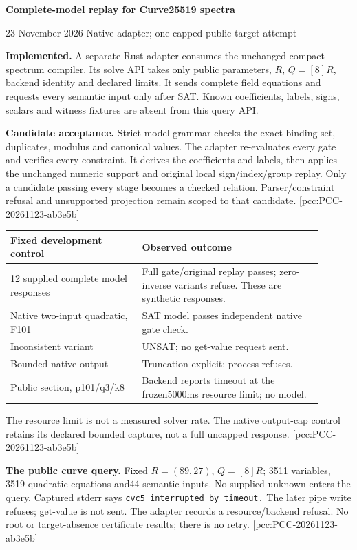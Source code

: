 \documentclass[10pt]{article}
\begin{document}
{\Large\bfseries\color{ink} Complete-model replay for Curve25519 spectra}\par
{\small 23 November 2026 \quad Native adapter; one capped public-target attempt}

\textbf{Implemented.} A separate Rust adapter consumes the unchanged compact
spectrum compiler. Its solve API takes only public parameters, $R$, $Q=[8]R$,
backend identity and declared limits. It sends complete field equations and
requests every semantic input only after SAT. Known coefficients, labels,
signs, scalars and witness fixtures are absent from this query API.

\textbf{Candidate acceptance.} Strict model grammar checks the exact binding
set, duplicates, modulus and canonical values. The adapter re-evaluates every
gate and verifies every constraint. It derives the coefficients and labels,
then applies the unchanged numeric support and original local sign/index/group
replay. Only a candidate passing every stage becomes a checked relation.
Parser/constraint refusal and unsupported projection remain scoped to that
candidate. [pcc:PCC-20261123-ab3e5b]

\begin{center}
\begin{tabular}{p{0.38\linewidth}p{0.52\linewidth}}
\toprule
Fixed development control & Observed outcome\\
\midrule
12 supplied complete model responses & Full gate/original replay passes; zero-inverse variants refuse. These are synthetic responses.\\
Native two-input quadratic, F101 & SAT model passes independent native gate check.\\
Inconsistent variant & UNSAT; no get-value request sent.\\
Bounded native output & Truncation explicit; process refuses.\\
Public section, p101/q3/k8 & Backend reports timeout at the frozen5000ms resource limit; no model.\\
\bottomrule
\end{tabular}
\end{center}
The resource limit is not a measured solver rate. The native output-cap
control retains its declared bounded capture, not a full uncapped response.
[pcc:PCC-20261123-ab3e5b]

\textbf{The public curve query.} Fixed $R=(89,27)$, $Q=[8]R$; 3511 variables,
3519 quadratic equations and44 semantic inputs. No supplied unknown enters
the query. Captured stderr says \texttt{cvc5 interrupted by timeout.}
The later pipe write refuses; get-value is not sent. The adapter records a
resource/backend refusal. No root or target-absence certificate results;
there is no retry. [pcc:PCC-20261123-ab3e5b]
\end{document}
